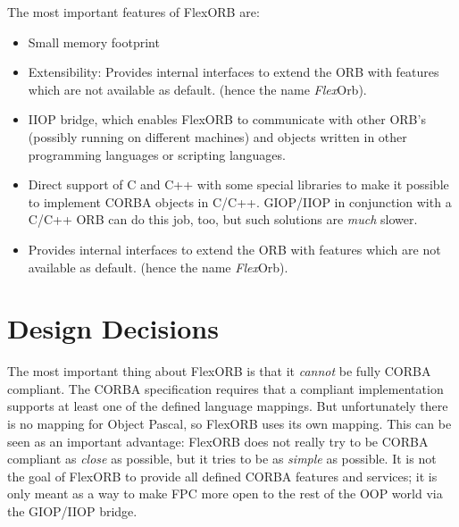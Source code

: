 \documentclass{report}
\begin{document}
The most important features of FlexORB are:
\begin{itemize}
\item Small memory footprint
\item Extensibility: Provides internal interfaces to extend the ORB with
      features which are not available as default.
      (hence the name \textit{Flex}Orb).
\item IIOP bridge, which enables FlexORB to communicate with other ORB's
      (possibly running on different machines) and objects written in other
      programming languages or scripting languages.
\item Direct support of C and C++ with some special libraries to make it
      possible to implement CORBA objects in C/C++. GIOP/IIOP in conjunction
      with a C/C++ ORB can do this job, too, but such solutions are
      \textit{much} slower.
\item Provides internal interfaces to extend the ORB with features which are
      not available as default. (hence the name \textit{Flex}Orb).
\end{itemize}


\section{Design Decisions}
The most important thing about FlexORB is that it \textit{cannot} be fully CORBA
compliant. The CORBA specification requires that a compliant implementation
supports at least one of the defined language mappings. But unfortunately there
is no mapping for Object Pascal, so FlexORB uses its own mapping. This can be
seen as an important advantage: FlexORB does not really try to be CORBA
compliant as \textit{close} as possible, but it tries to be as \textit{simple}
as possible. It is not the goal of FlexORB to provide all defined CORBA
features and services; it is only meant as a way to make FPC more open to the
rest of the OOP world via the GIOP/IIOP bridge.
\end{document}
